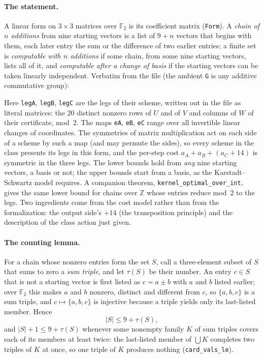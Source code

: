 \documentclass[11pt]{article}
\theoremstyle{definition}
\theoremstyle{remark}
\newcommand{\F}{\mathbb{F}}
\newcommand{\Z}{\mathbb{Z}}
\begin{document}
\paragraph{The statement.}  A linear form on $3\times3$ matrices over
$\F_2$ is its coefficient matrix (\texttt{Form}).  A \emph{chain of $n$
additions} from nine starting vectors is a list of $9+n$ vectors that
begins with them, each later entry the sum or the difference of two
earlier entries; a finite set is \emph{computable with $n$ additions} if
some chain, from some nine starting vectors, lists all of it, and
\emph{computable after a change of basis} if the starting vectors can be
taken linearly independent.  Verbatim from the file (the ambient
\texttt{G} is any additive commutative group):

{\footnotesize

}

\noindent
Here \texttt{legA}, \texttt{legB}, \texttt{legC} are the legs of their
scheme, written out in the file as literal matrices: the $20$ distinct
nonzero rows of $U$ and of $V$ and columns of $W$ of their certificate,
mod~$2$.  The maps \texttt{eA}, \texttt{eB}, \texttt{eC} range over all
invertible linear changes of coordinates.  The symmetries of matrix
multiplication act on each side of a scheme by such a map (and may
permute the sides), so every scheme in the class presents its legs in
this form, and the per-step cost $a_A + a_B + (a_C + 14)$ is symmetric
in the three legs.  The lower bounds hold from \emph{any} nine starting
vectors, a basis or not; the upper bounds start from a basis, as the
Karstadt--Schwartz model requires.  A companion theorem,
\texttt{kernel\_optimal\_over\_int}, gives the same lower bound for chains
over $\Z$ whose entries reduce mod~$2$ to the legs.  Two ingredients come
from the cost model rather than from the formalization: the output
side's $+14$ (the transposition principle) and the description of the
class action just given.

\paragraph{The counting lemma.}  For a chain whose nonzero entries form
the set $S$, call a three-element subset of $S$ that sums to zero a
\emph{sum triple}, and let $\tau(S)$ be their number.  An entry $c\in S$
that is not a starting vector is first listed as $c=a\pm b$ with $a$ and
$b$ listed earlier; over $\F_2$ this makes $a$ and $b$ nonzero, distinct
and different from $c$, so $\{a,b,c\}$ is a sum triple, and
$c\mapsto\{a,b,c\}$ is injective because a triple yields only its
last-listed member.  Hence
\[
  |S| \le 9 + \tau(S),
\]
and $|S|+1 \le 9 + \tau(S)$ whenever some nonempty family $K$ of sum
triples covers each of its members at least twice: the last-listed
member of $\bigcup K$ completes two triples of $K$ at once, so one triple
of $K$ produces nothing (\texttt{card\_vals\_le}).
\end{document}
